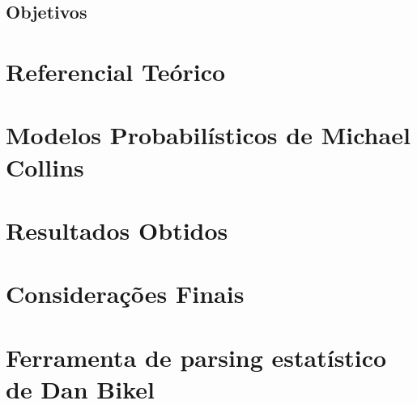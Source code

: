\documentclass[a4paper]{abnt}
\begin{document}
\section{Objetivos}
\label{cha:objetivos}
	

\chapter{Referencial Teórico}
\label{cha:referencial_teorico}
	

%	

\chapter{Modelos Probabilísticos de Michael Collins}
\label{cha:michael_collins}
	

%	

%	

\chapter{Resultados Obtidos}
\label{cha:resultados_parciais}
	

\chapter{Considerações Finais}
\label{cha:consuderacoes_finais}
	

\appendix

\chapter{Ferramenta de parsing estatístico de Dan Bikel}
\label{cha:dan_bikel1}
	


%	

%

\renewcommand{\bibname}{Referência Bibliografia}

\end{document}
